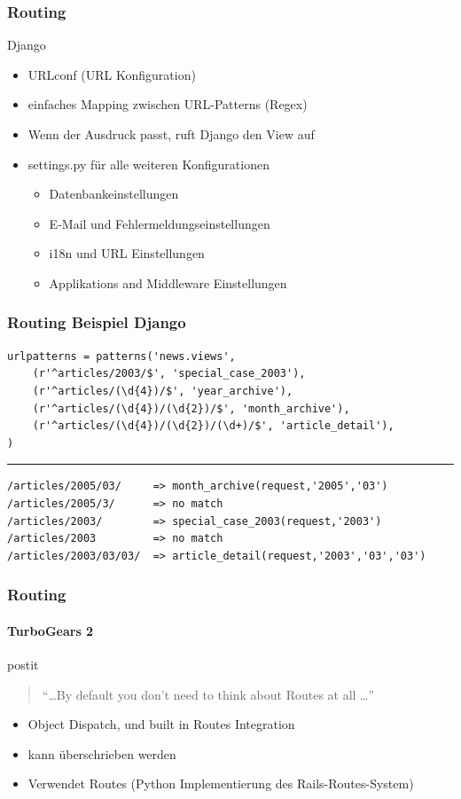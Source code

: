 \documentclass[
    t,
    smaller,
    compress,
    xcolor=svgnames,            %
    table,
]{beamer}
\newenvironment{beamerpostit}[1]%
{\begin{beamercolorbox}[wd=\textwidth,sep=2pt,rounded=true,shadow=true]{postit} #1}%
{\end{beamercolorbox}}%
\begin{document}
\begin{frame}
  \frametitle{Routing}
    Django
    \begin{itemize}[<1->]
        \item URLconf (URL Konfiguration)
        \item einfaches Mapping zwischen URL-Patterns (Regex)
        \item Wenn der Ausdruck passt, ruft Django den View auf
        \item settings.py für alle weiteren Konfigurationen
        \begin{itemize}[<1->]
            \item Datenbankeinstellungen
            \item E-Mail und Fehlermeldungseinstellungen
            \item i18n und URL Einstellungen
            \item Applikations and Middleware Einstellungen
        \end{itemize}
     \end{itemize}

\end{frame}

\begin{frame}[fragile]
\frametitle{Routing Beispiel Django}
\begin{lstlisting}
urlpatterns = patterns('news.views',
    (r'^articles/2003/$', 'special_case_2003'),
    (r'^articles/(\d{4})/$', 'year_archive'),
    (r'^articles/(\d{4})/(\d{2})/$', 'month_archive'),
    (r'^articles/(\d{4})/(\d{2})/(\d+)/$', 'article_detail'),
)
\end{lstlisting}
\hrule
    \vspace{10pt}
\begin{lstlisting}
/articles/2005/03/     => month_archive(request,'2005','03')
/articles/2005/3/      => no match
/articles/2003/        => special_case_2003(request,'2003')
/articles/2003         => no match
/articles/2003/03/03/  => article_detail(request,'2003','03','03')
    \end{lstlisting}
\end{frame}


\begin{frame}
  \frametitle{Routing}
\framesubtitle{TurboGears 2}

\begin{beamerpostit}
    \begin{quote}
      “\dots By default you don’t need to think about Routes at all \dots”
    \end{quote} %
  \end{beamerpostit}
    \vspace{15pt}
     \begin{itemize}[<1->]
        \item Object Dispatch, und built in Routes Integration
        \item kann überschrieben werden
        \item Verwendet Routes (Python Implementierung des Rails-Routes-System)
    \end{itemize}
\end{frame}
\end{document}
